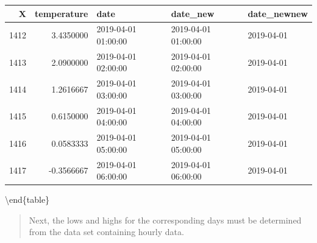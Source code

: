 \documentclass[
]{book}
\newenvironment{Shaded}{\begin{snugshade}}{\end{snugshade}}
\newcommand{\DataTypeTok}[1]{\textcolor[rgb]{0.13,0.29,0.53}{#1}}
\newcommand{\DecValTok}[1]{\textcolor[rgb]{0.00,0.00,0.81}{#1}}
\newcommand{\KeywordTok}[1]{\textcolor[rgb]{0.13,0.29,0.53}{\textbf{#1}}}
\newcommand{\NormalTok}[1]{#1}
\newcommand{\OperatorTok}[1]{\textcolor[rgb]{0.81,0.36,0.00}{\textbf{#1}}}
\newcommand{\OtherTok}[1]{\textcolor[rgb]{0.56,0.35,0.01}{#1}}
\newcommand{\StringTok}[1]{\textcolor[rgb]{0.31,0.60,0.02}{#1}}
\begin{document}
\begin{tabular}[t]{r|r|l|l|l}
\hline
X & temperature & date & date\_new & date\_newnew\\
\hline
1412 & 3.4350000 & 2019-04-01 01:00:00 & 2019-04-01 01:00:00 & 2019-04-01\\
\hline
1413 & 2.0900000 & 2019-04-01 02:00:00 & 2019-04-01 02:00:00 & 2019-04-01\\
\hline
1414 & 1.2616667 & 2019-04-01 03:00:00 & 2019-04-01 03:00:00 & 2019-04-01\\
\hline
1415 & 0.6150000 & 2019-04-01 04:00:00 & 2019-04-01 04:00:00 & 2019-04-01\\
\hline
1416 & 0.0583333 & 2019-04-01 05:00:00 & 2019-04-01 05:00:00 & 2019-04-01\\
\hline
1417 & -0.3566667 & 2019-04-01 06:00:00 & 2019-04-01 06:00:00 & 2019-04-01\\
\hline
\end{tabular}

\textbackslash end\{table\}

\begin{quote}
Next, the lows and highs for the corresponding days must be determined from the data set containing hourly data.
\end{quote}

\begin{Shaded}
\end{Shaded}
\end{document}
